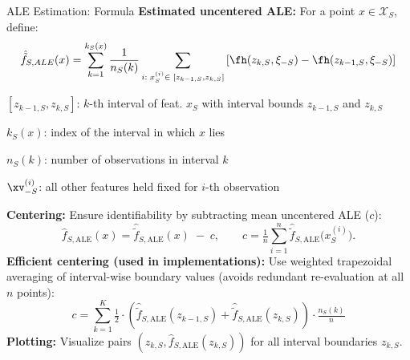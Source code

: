\documentclass[10pt,compress,t,notes=noshow, xcolor=table]{beamer}
\begin{document}

\begin{framev}[fs=small,align=top]{ALE Estimation: Formula}
\textbf{Estimated uncentered ALE:}
For a point $x \in \mathcal{X}_S$, define:
$$
\hat{\tilde{f}}_{S, ALE}(x) = \sum_{k = 1}^{k_S(x)}\frac{1}{n_S(k)}\sum_{i: \; x_S^{(i)} \in \; [z_{k-1, S}, z_{k, S}]}\left[\fh(z_{k, S}, \xi_{-S}) -\fh(z_{k-1, S}, \xi_{-S})\right]
$$
\begin{itemizeM}
\item $[z_{k-1, S}, z_{k,S}]$: $k$-th interval of feat. $x_S$ with interval bounds $z_{k-1, S}$ and $z_{k,S}$
\item $k_S(x)$: index of the interval in which $x$ lies
\item $n_S(k)$: number of observations in interval $k$
\item $\xv_{-S}^{(i)}$: all other features held fixed for $i$-th observation
\end{itemizeM}
\pause
\spacer[0.25]
\textbf{Centering:}
Ensure identifiability by subtracting mean uncentered ALE ($c$):
$$
\hat f_{S,\text{ALE}}(x)=
\hat{\tilde f}_{S,\text{ALE}}(x)\;-\;c,
\qquad
c=\tfrac{1}{n}\textstyle\sum_{i=1}^{n}\hat{\tilde f}_{S,\text{ALE}}\bigl(x_S^{(i)}\bigr).
$$
\textbf{Efficient centering (used in implementations):}
Use weighted trapezoidal averaging of interval-wise boundary values (avoids redundant re-evaluation at all $n$ points):
$$
c =
\textstyle\sum_{k = 1}^{K}
\tfrac{1}{2} \cdot \left(
\hat{\tilde{f}}_{S, \text{ALE}}(z_{k-1,S}) +
\hat{\tilde{f}}_{S, \text{ALE}}(z_{k,S}) \right) \cdot \tfrac{n_S(k)}{n}
$$
\textbf{Plotting:} Visualize pairs $\left( z_{k,S}, \hat{f}_{S, \text{ALE}}(z_{k,S}) \right)$ for all interval boundaries $z_{k,S}$.
\end{framev}




\end{document}
